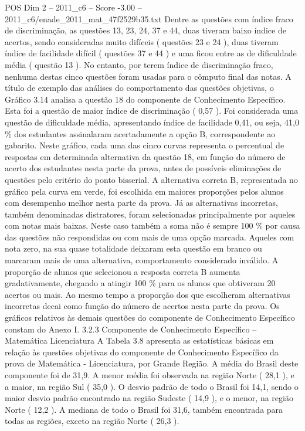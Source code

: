 \begin{textsample}{POS Dim 2 – 2011\_c6 – Score -3.00 – 2011\_c6/enade\_2011\_mat\_47f2529b35.txt}
Dentre as questões com índice fraco de discriminação, as questões 13, 23, 24, 37 e 44, duas tiveram baixo índice de acertos, sendo consideradas muito difíceis ( questões 23 e 24 ), duas tiveram índice de facilidade difícil ( questões 37 e 44 ) e uma ficou entre as de dificuldade média ( questão 13 ).
No entanto, por terem índice de discriminação fraco, nenhuma destas cinco questões foram usadas para o cômputo final das notas.
A título de exemplo das análises do comportamento das questões objetivas, o Gráfico 3.14 analisa a questão 18 do componente de Conhecimento Específico.
Esta foi a questão de maior índice de discriminação ( 0,57 ).
Foi considerada uma questão de dificuldade média, apresentando índice de facilidade 0,41, ou seja, 41,0 \% dos estudantes assinalaram acertadamente a opção B, correspondente ao gabarito.
Neste gráfico, cada uma das cinco curvas representa o percentual de respostas em determinada alternativa da questão 18, em função do número de acerto dos estudantes nesta parte da prova, antes de possíveis eliminações de questões pelo critério do ponto bisserial.
A alternativa correta B, representada no gráfico pela curva em verde, foi escolhida em maiores proporções pelos alunos com desempenho melhor nesta parte da prova.
Já as alternativas incorretas, também denominadas distratores, foram selecionadas principalmente por aqueles com notas mais baixas.
Neste caso também a soma não é sempre 100 \% por causa das questões não respondidas ou com mais de uma opção marcada.
Aqueles com nota zero, na sua quase totalidade deixaram esta questão em branco ou marcaram mais de uma alternativa, comportamento considerado inválido.
A proporção de alunos que selecionou a resposta correta B aumenta gradativamente, chegando a atingir 100 \% para os alunos que obtiveram 20 acertos ou mais.
Ao mesmo tempo a proporção dos que escolheram alternativas incorretas decai como função do número de acertos nesta parte da prova.
Os gráficos relativos às demais questões do componente de Conhecimento Específico constam do Anexo I. 3.2.3 Componente de Conhecimento Específico – Matemática Licenciatura A Tabela 3.8 apresenta as estatísticas básicas em relação às questões objetivas do componente de Conhecimento Específico da prova de Matemática - Licenciatura, por Grande Região.
A média do Brasil deste componente foi de 31,9.
A menor média foi observada na região Norte ( 28,1 ), e a maior, na região Sul ( 35,0 ).
O desvio padrão de todo o Brasil foi 14,1, sendo o maior desvio padrão encontrado na região Sudeste ( 14,9 ), e o menor, na região Norte ( 12,2 ).
A mediana de todo o Brasil foi 31,6, também encontrada para todas as regiões, exceto na região Norte ( 26,3 ).

\end{textsample}
